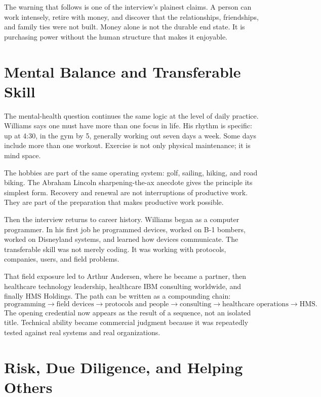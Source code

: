 The warning that follows is one of the interview's plainest claims. A person can work intensely, retire with money, and discover that the relationships, friendships, and family ties were not built. Money alone is not the durable end state. It is purchasing power without the human structure that makes it enjoyable.

\section{Mental Balance and Transferable Skill}

The mental-health question continues the same logic at the level of daily practice. Williams says one must have more than one focus in life. His rhythm is specific: up at 4:30, in the gym by 5, generally working out seven days a week. Some days include more than one workout. Exercise is not only physical maintenance; it is mind space.

The hobbies are part of the same operating system: golf, sailing, hiking, and road biking. The Abraham Lincoln sharpening-the-ax anecdote gives the principle its simplest form. Recovery and renewal are not interruptions of productive work. They are part of the preparation that makes productive work possible.

Then the interview returns to career history. Williams began as a computer programmer. In his first job he programmed devices, worked on B-1 bombers, worked on Disneyland systems, and learned how devices communicate. The transferable skill was not merely coding. It was working with protocols, companies, users, and field problems.

That field exposure led to Arthur Andersen, where he became a partner, then healthcare technology leadership, healthcare IBM consulting worldwide, and finally HMS Holdings. The path can be written as a compounding chain:
\begin{equation}
\text{programming}
\longrightarrow
\text{field devices}
\longrightarrow
\text{protocols and people}
\longrightarrow
\text{consulting}
\longrightarrow
\text{healthcare operations}
\longrightarrow
\text{HMS}.
\end{equation}
The opening credential now appears as the result of a sequence, not an isolated title. Technical ability became commercial judgment because it was repeatedly tested against real systems and real organizations.

\section{Risk, Due Diligence, and Helping Others}

